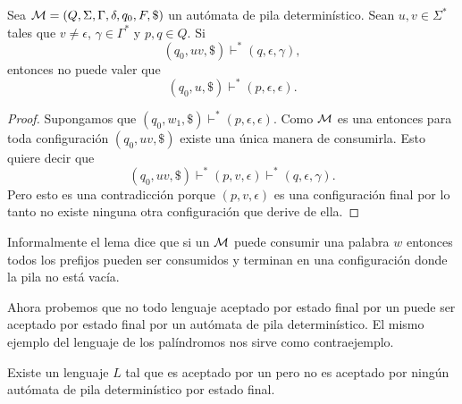 \documentclass[tesis.tex]{subfiles}
\begin{document}
\begin{lema}\label{lema_configuracion_prefijo}
	Sea ${\cal M} = (Q, \Sigma, \Gamma, \delta, q_0, F, \$)$ un autómata de pila determinístico.
	Sean $u, v \in \Sigma^*$ tales que $v \neq \epsilon$, $\gamma \in \Gamma^*$ y $p,q \in Q$.
	Si
	\[
		(q_{0},uv, \$) \vdash^* (q,\epsilon, \gamma),
	\]
	entonces no puede valer que 
	\[
		(q_{0},u, \$) \vdash^* (p, \epsilon, \epsilon).
	\]
\end{lema}
\begin{proof}
	Supongamos que $(q_{0},w_{1}, \$) \vdash^* (p, \epsilon, \epsilon)$.
	Como $\cal M$ es una \APD entonces para toda configuración $(q_{0}, uv, \$)$ existe una única manera de consumirla.
	Esto quiere decir que 
	\[
		(q_{0},uv, \$) \vdash^* (p,v, \epsilon) \vdash^* (q,\epsilon, \gamma).
	\]
	Pero esto es una contradicción porque $(p, v, \epsilon)$ es una configuración final por lo tanto no existe ninguna otra configuración que derive de ella.
\end{proof}

Informalmente el lema dice que si un \APD $\cal M$ puede consumir una palabra $w$ entonces todos los prefijos pueden ser consumidos y terminan en una configuración donde la pila no está vacía.

Ahora probemos que no todo lenguaje aceptado por estado final por un \APND puede ser aceptado por estado final por un autómata de pila determinístico.
El mismo ejemplo del lenguaje de los palíndromos nos sirve como contraejemplo.
\begin{prop}
	Existe un lenguaje $L$ tal que es aceptado por un \APND pero no es aceptado por ningún autómata de pila determinístico por estado final.
\end{prop}
\end{document}
